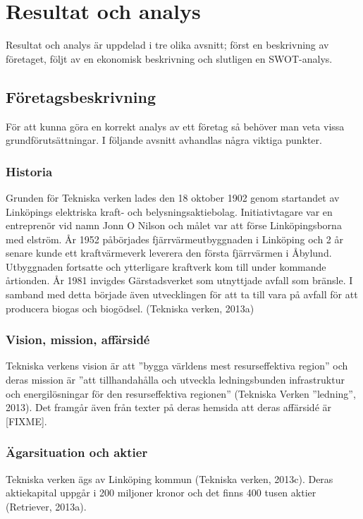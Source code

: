 \documentclass[10pt,a4paper]{article}
\begin{document}
\section{Resultat och analys}
Resultat och analys är uppdelad i tre olika avsnitt; först en beskrivning av
företaget, följt av en ekonomisk beskrivning och slutligen en SWOT-analys.

\subsection{Företagsbeskrivning}
För att kunna göra en korrekt analys av ett företag så behöver man veta vissa
grundförutsättningar. I följande avsnitt avhandlas några viktiga punkter. 

\subsubsection{Historia}
Grunden för Tekniska verken lades den 18 oktober 1902 genom startandet av
Linköpings elektriska kraft- och belysningsaktiebolag. Initiativtagare var en
entreprenör vid namn Jonn O Nilson och målet var att förse Linköpingsborna med
elström. År 1952 påbörjades fjärrvärmeutbyggnaden i Linköping och 2 år senare
kunde ett kraftvärmeverk leverera den första fjärrvärmen i Åbylund. Utbyggnaden
fortsatte och ytterligare kraftverk kom till under kommande årtionden. År 1981 
invigdes Gärstadsverket som utnyttjade avfall som bränsle. I samband med detta
började även utvecklingen för att ta till vara på avfall för att producera biogas 
och biogödsel. (Tekniska verken, 2013a) 

\subsubsection{Vision, mission, affärsidé}
Tekniska verkens vision är att ''bygga världens mest resurseffektiva
region'' och deras mission är ''att tillhandahålla och utveckla
ledningsbunden infrastruktur och energilösningar för den
resurseffektiva regionen'' (Tekniska Verken ''ledning'', 2013). Det framgår även
från texter på deras hemsida att deras affärsidé är [FIXME].

\subsubsection{Ägarsituation och aktier}
Tekniska verken ägs av Linköping kommun (Tekniska verken, 2013c). Deras
aktiekapital uppgår i 200 miljoner kronor och det finns 400 tusen
aktier (Retriever, 2013a).
\end{document}
